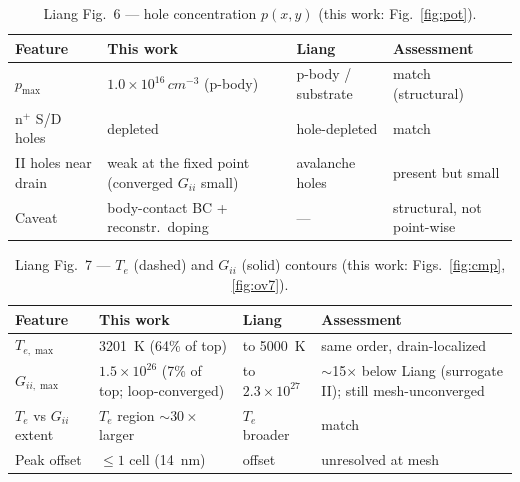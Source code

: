 \documentclass[11pt]{article}
\begin{document}
\begin{table}[h]\centering\small
\caption{Liang Fig.~6 --- hole concentration $p(x,y)$ (this work: Fig.~\ref{fig:pot}).}\label{tab:f6}
\begin{tabular}{p{3.5cm}p{3.9cm}p{2.9cm}p{3.2cm}}
\toprule
Feature & This work & Liang & Assessment \\
\midrule
$p_{\max}$ & $1.0\times10^{16}\,\si{cm^{-3}}$ (p-body) & p-body / substrate & match (structural) \\
n$^+$ S/D holes & depleted & hole-depleted & match \\
II holes near drain & weak at the fixed point (converged $G_{ii}$ small) & avalanche holes & present but small \\
Caveat & body-contact BC + reconstr.\ doping & --- & structural, not point-wise \\
\bottomrule
\end{tabular}
\end{table}

\begin{table}[h]\centering\small
\caption{Liang Fig.~7 --- $T_e$ (dashed) and $G_{ii}$ (solid) contours (this work: Figs.~\ref{fig:cmp},\ref{fig:ov7}).}\label{tab:f7}
\begin{tabular}{p{3.5cm}p{3.9cm}p{2.9cm}p{3.2cm}}
\toprule
Feature & This work & Liang & Assessment \\
\midrule
$T_{e,\max}$ & \SI{3201}{K} (64\% of top) & to \SI{5000}{K} & same order, drain-localized \\
$G_{ii,\max}$ & $1.5\times10^{26}$ (7\% of top; loop-converged) & to $2.3\times10^{27}$ & $\sim$15$\times$ below Liang (surrogate II); still mesh-unconverged \\
$T_e$ vs $G_{ii}$ extent & $T_e$ region $\sim\!30\times$ larger & $T_e$ broader & match \\
Peak offset & $\le\!1$ cell (14~nm) & offset & unresolved at mesh \\
\bottomrule
\end{tabular}
\end{table}
\end{document}
